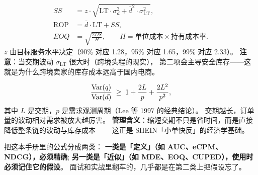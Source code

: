 \begin{formulacard}
\begin{align}
SS &= z \cdot \sqrt{\text{LT} \cdot \sigma_d^2 + \bar{d}^2 \cdot \sigma_{\text{LT}}^2} , \\
\text{ROP} &= \bar{d} \cdot \text{LT} + SS , \\
EOQ &= \sqrt{\frac{2 D S}{H}} , \qquad H = \text{单位成本} \times \text{持有成本率} .
\end{align}
$z$ 由目标服务水平决定（90\% 对应 1.28，95\% 对应 1.65，99\% 对应 2.33）。
\textbf{注意}：当交期波动 $\sigma_{\text{LT}}$ 很大时（跨境头程的现实），
第二项会主导安全库存——这就是为什么跨境卖家的库存成本远高于国内电商。
\end{formulacard}

\begin{formulacard}
\begin{equation}
\frac{\operatorname{Var}(q)}{\operatorname{Var}(d)} \;\ge\; 1 + \frac{2L}{p} + \frac{2L^2}{p^2} ,
\end{equation}
其中 $L$ 是交期，$p$ 是需求观测周期（Lee 等 1997 的经典结论）。
交期越长，订单量的波动相对需求被放大越厉害。
\textbf{管理含义}：缩短交期不只是省时间，而是直接降低整条链的波动与库存成本——
这正是 SHEIN「小单快反」的经济学基础。
\end{formulacard}

\begin{keypoint}[最后一句话]
把这本手册里的公式分成两类：
\textbf{一类是「定义」（如 AUC、eCPM、NDCG），必须精确};
\textbf{另一类是「近似」（如 MDE、EOQ、CUPED），使用时必须记住它的假设}。
面试和实战里翻车的，几乎都是在第二类上把假设忘了。
\end{keypoint}
